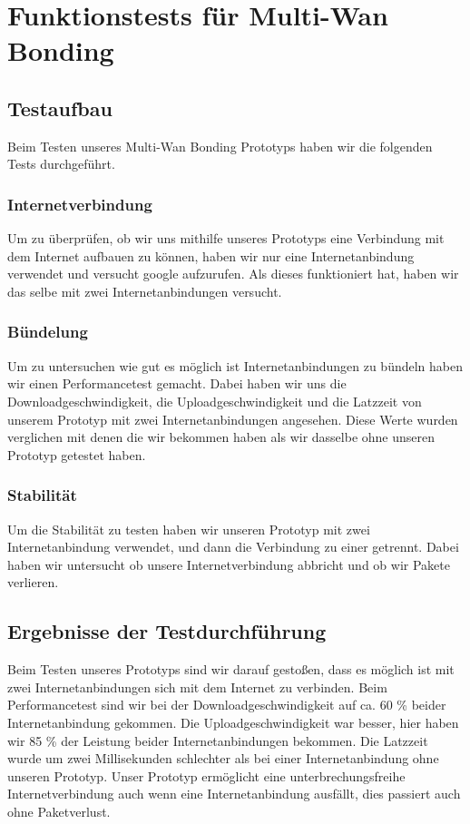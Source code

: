 \chapter{Funktionstests für Multi-Wan Bonding}
\label{cha:Funktionstests für Multi-Wan Bonding}

\section{Testaufbau}
Beim Testen unseres Multi-Wan Bonding Prototyps haben wir die folgenden Tests durchgeführt. 

\subsection{Internetverbindung}
Um zu überprüfen, ob wir uns mithilfe unseres Prototyps eine Verbindung mit dem Internet aufbauen zu können, haben wir nur eine Internetanbindung verwendet und versucht google aufzurufen. Als dieses funktioniert hat, haben wir das selbe mit zwei Internetanbindungen versucht.

\subsection{Bündelung}
Um zu untersuchen wie gut es möglich ist Internetanbindungen zu bündeln haben wir einen Performancetest gemacht. Dabei haben wir uns die Downloadgeschwindigkeit, die Uploadgeschwindigkeit und die Latzzeit von unserem Prototyp mit zwei Internetanbindungen angesehen. Diese Werte wurden verglichen mit denen die wir bekommen haben als wir dasselbe ohne unseren Prototyp getestet haben. 

\subsection{Stabilität}
Um die Stabilität zu testen haben wir unseren Prototyp mit zwei Internetanbindung verwendet, und dann die Verbindung zu einer getrennt. Dabei haben wir untersucht ob unsere Internetverbindung abbricht und ob wir Pakete verlieren. 

\newpage

\section{Ergebnisse der Testdurchführung}
Beim Testen unseres Prototyps sind wir darauf gestoßen, dass es möglich ist mit zwei Internetanbindungen sich mit dem Internet zu verbinden. Beim Performancetest sind wir bei der Downloadgeschwindigkeit auf ca. 60 \% beider Internetanbindung gekommen. Die Uploadgeschwindigkeit war besser, hier haben wir 85 \% der Leistung beider Internetanbindungen bekommen. Die Latzzeit wurde um zwei Millisekunden schlechter als bei einer Internetanbindung ohne unseren Prototyp. Unser Prototyp ermöglicht eine unterbrechungsfreihe Internetverbindung auch wenn eine Internetanbindung ausfällt, dies passiert auch ohne Paketverlust.